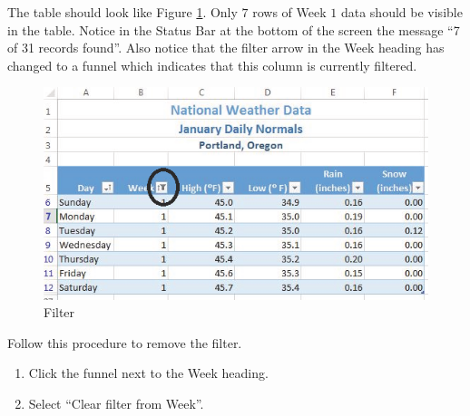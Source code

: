 The table should look like Figure \ref{05:fig16}. Only $ 7 $ rows of Week $ 1 $ data should be visible in the table. Notice in the Status Bar at the bottom of the screen the message ``7 of 31 records found''. Also notice that the filter arrow in the Week heading has changed to a funnel which indicates that this column is currently filtered.

\begin{figure}[H]
	\centering
	\includegraphics[width=\maxwidth{.95\linewidth}]{gfx/ch05_fig16}
	\caption{Filter}
	\label{05:fig16}
\end{figure}

Follow this procedure to remove the filter.

\begin{enumerate}
	\item Click the funnel next to the Week heading.
	\item Select ``Clear filter from Week''.
\end{enumerate}

